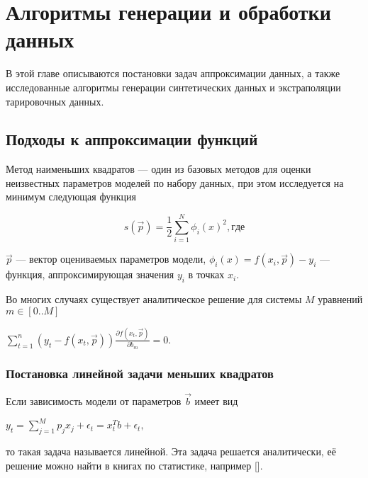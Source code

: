\chapter{Алгоритмы генерации и обработки данных} \label{chapt2}

В этой главе описываются постановки задач аппроксимации данных, а также исследованные алгоритмы генерации 
синтетических данных и
экстраполяции тарировочных данных. 


\section{Подходы к аппроксимации функций}\label{sect2_1}
Метод наименьших квадратов --- один из базовых методов для оценки неизвестных 
параметров моделей по набору данных, при этом исследуется на минимум
следующая функция

\begin{equation}
\label{eq:square_minimum}
s(\vec{p}) = \frac{1}{2} \displaystyle \sum_{i=1}^N \phi_i(x)^2 , где
\end{equation}




$\vec{p}$ --- вектор оцениваемых параметров модели, $\phi_i(x) = f(x_i, \vec{p}) - y_i $
--- функция, аппроксимирующая значения $y_i$ в точках $x_i$.

Во многих случаях существует аналитическое решение для системы $M$ уравнений 
$m \in [0..M]$
\begin{center}
 $ \displaystyle\sum_{t = 1}^n \left( y_t - f(x_t,\vec{p})\right) 
 \frac{\partial f(x_t, \vec{p})}{\partial b_m} = 0.$
\end{center}

\subsection{Постановка линейной задачи меньших квадратов}

Если зависимость модели от параметров $\vec{b}$ имеет вид 

\begin{center}
$ y_t = \displaystyle\sum_{j=1}^{M}p_j x_j + \epsilon_t = 
x^T_tb + \epsilon_t, $ 
\end{center}
 то такая задача называется линейной. Эта задача решается аналитически, 
её решение можно найти в книгах по статистике, например [].



